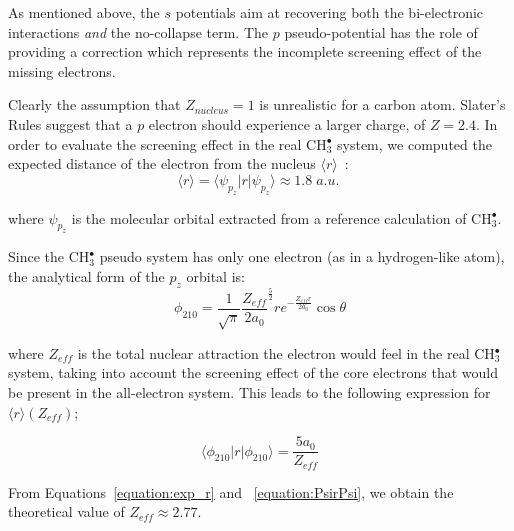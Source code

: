 \documentclass[12pt]{article}
\begin{document}
As mentioned above, the $s$ potentials aim at recovering both the bi-electronic interactions \textit{and} the no-collapse term. The \(p\) pseudo-potential has the role of providing a correction which represents the incomplete screening effect of the missing electrons.

Clearly the assumption that \(Z_{nucleus} = 1\) is unrealistic for a carbon atom. Slater's Rules\cite{slatersrules} suggest that
a \(p\) electron should experience a larger charge, of \(Z = 2.4\). 
In order to evaluate the screening effect in the real CH\(^{\bullet}_{3}\) system, we computed the expected 
distance of the electron from the nucleus \( \langle r \rangle \)~:
\begin{equation}
\langle r \rangle = \langle \psi_{p_{z}} | r | \psi_{p_{z}} \rangle \approx 1.8\;a.u.\
\label{equation:exp_r}
\end{equation}

where \(\psi_{p_{z}}\) is the molecular orbital extracted from a reference calculation of CH\(^{\bullet}_{3}\). 

Since the CH\(^{\bullet}_{3}\) pseudo system has only one electron (as in a hydrogen-like atom), 
the analytical form of the \(p_{z}\) orbital is:~\cite{nyu_h_solutions} 
\begin{equation}
\label{equation:analyticalpz}
\phi_{210} = \frac{1}{\sqrt{\pi}} \frac{Z_{eff}}{2a_{0}} ^{\frac{5}{2}} re^{-\frac{Z_{eff}r}{2a_{0}}} \cos \theta
\end{equation}

where \(Z_{eff}\) is the total nuclear attraction the electron 
would feel in the real CH\(^{\bullet}_{3}\) system, taking into account the screening effect of the core electrons that would be 
present in the all-electron system.
This leads to the following expression for \( \langle r \rangle (Z_{eff}) \); 

\begin{equation}
\label{equation:PsirPsi}
\langle \phi_{210} | r | \phi_{210} \rangle = \frac{5a_{0}}{Z_{eff}}
\end{equation}

From Equations~\ref{equation:exp_r} and ~\ref{equation:PsirPsi}, we obtain the theoretical value of \(Z_{eff} \approx 2.77\).
\end{document}
